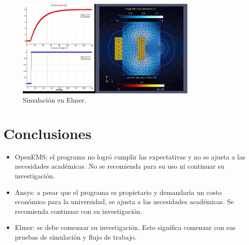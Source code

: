 \documentclass[
    11pt,
    spanish,
    a4paper
]{article}
\begin{document}
\begin{figure}[htbp]
	\centering
	\includegraphics[width=0.8\textwidth]{img/elmer.jpg}
	\caption{Simulación en Elmer.}
	\label{fig:elmer}
\end{figure}

\newpage

\section{Conclusiones}

\begin{itemize}
	\item OpenEMS: el programa no logró cumplir las expectativas y no se ajusta a las necesidades académicas. No se recomienda para su uso ni continuar su investigación.
	\item Ansys: a pesar que el programa es propietario y demandaría un costo económico para la universidad, se ajusta a las necesidades académicas. Se recomienda continuar con su investigación.
	\item Elmer: se debe comenzar su investigación. Esto significa comenzar con sus pruebas de simulación y flujo de trabajo.
\end{itemize}
\end{document}
